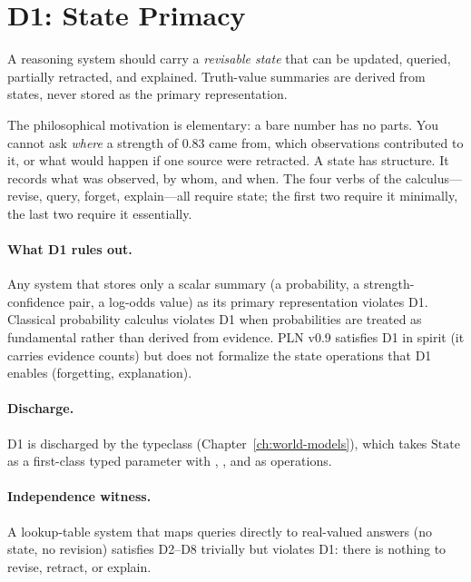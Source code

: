 \documentclass[11pt,openany]{report}
\begin{document}
\section{D1: State Primacy}
\label{sec:d1}

\begin{definition}
\label{def:d1}
A reasoning system should carry a \emph{revisable state} that can be
updated, queried, partially retracted, and explained.  Truth-value
summaries are derived from states, never stored as the primary
representation.
\end{definition}

\noindent
The philosophical motivation is elementary: a bare number has no parts.
You cannot ask \emph{where} a strength of $0.83$ came from, which
observations contributed to it, or what would happen if one source were
retracted.  A state has structure.  It records what was observed, by
whom, and when.  The four verbs of the calculus---revise, query,
forget, explain---all require state; the first two require it
minimally, the last two require it essentially.

\paragraph{What D1 rules out.}
Any system that stores only a scalar summary (a probability, a
strength-confidence pair, a log-odds value) as its primary
representation violates D1.  Classical probability calculus violates D1
when probabilities are treated as fundamental rather than derived from
evidence.  PLN v0.9 satisfies D1 in spirit (it carries evidence
counts) but does not formalize the state operations that D1 enables
(forgetting, explanation).

\paragraph{Discharge.}
D1 is discharged by the  typeclass
(Chapter~\ref{ch:world-models}), which takes $\mathrm{State}$ as a
first-class typed parameter with , , and
 as operations.

\paragraph{Independence witness.}
A lookup-table system that maps queries directly to real-valued
answers (no state, no revision) satisfies D2--D8 trivially but
violates D1: there is nothing to revise, retract, or explain.
\end{document}
